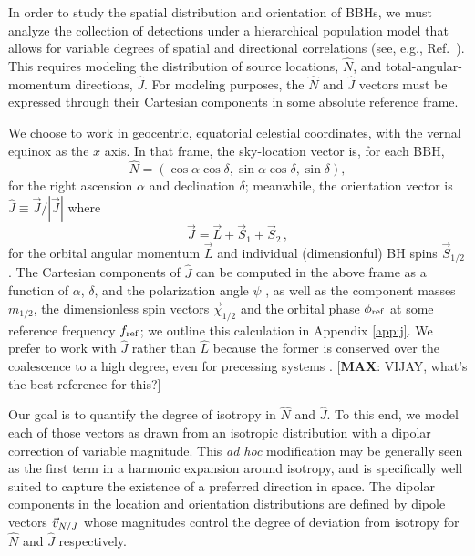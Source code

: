 \documentclass[aps,prd,twocolumn,superscriptaddress,preprintnumbers,floatfix,nofootinbib]{revtex4-2}
\newcommand*{\mi}[1]{{\color{magenta} [{\bf MAX}: #1]}}
\begin{document}
In order to study the spatial distribution and orientation of \acp{BBH}, we must analyze the collection of detections under a hierarchical population model that allows for variable degrees of spatial and directional correlations (see, e.g., Ref.~\cite{Essick:2022slj}).
This requires modeling the distribution of source locations, $\hat{N}$, and total-angular-momentum directions, $\hat{J}$.
For modeling purposes, the $\hat{N}$ and $\hat{J}$ vectors must be expressed through their Cartesian components in some absolute reference frame.

We choose to work in geocentric, equatorial celestial coordinates, with the vernal equinox as the $x$ axis.
In that frame, the sky-location vector is, for each \ac{BBH},
\begin{equation} \label{eq:n}
\hat{N} = \left( \cos\alpha \cos\delta, \sin\alpha \cos\delta, \sin\delta \right) ,
\end{equation}
for the right ascension $\alpha$ and declination $\delta$; meanwhile, the orientation vector is $\hat{J} \equiv \vec{J} / |\vec{J}|$ where
\begin{equation} \label{eq:j}
\vec{J} = \vec{L} + \vec{S}_1 + \vec{S}_2 \, ,
\end{equation}
for the orbital angular momentum $\vec{L}$ and individual (dimensionful) \ac{BH} spins $\vec{S}_{1/2}$.
The Cartesian components of $\hat{J}$ can be computed in the above frame as a function of $\alpha$, $\delta$, and the polarization angle $\psi$ \cite{Isi:2022mbx}, as well as the component masses $m_{1/2}$, the dimensionless spin vectors $\vec{\chi}_{1/2}$ and the orbital phase $\phi_{\rm ref}$ at some reference frequency $f_{\rm ref}$; we outline this calculation in Appendix \ref{app:j}.
We prefer to work with $\hat{J}$ rather than $\hat{L}$ because the former is conserved over the coalescence to a high degree, even for precessing systems \cite{}.
\mi{VIJAY, what's the best reference for this?}

Our goal is to quantify the degree of isotropy in $\hat{N}$ and $\hat{J}$.
To this end, we model each of those vectors as drawn from an isotropic distribution with a dipolar correction of variable magnitude.
This \emph{ad hoc} modification may be generally seen as the first term in a harmonic expansion around isotropy, and is specifically well suited to capture the existence of a preferred direction in space.
The dipolar components in the location and orientation distributions are defined by dipole vectors $\vec{v}_{N/J}$ whose magnitudes control the degree of deviation from isotropy for $\hat{N}$ and $\hat{J}$ respectively. 
\end{document}
